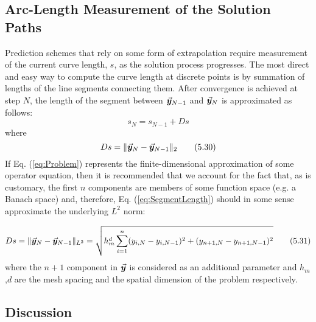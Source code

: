 \subsection{Arc-Length Measurement of the Solution Paths}
Prediction schemes that rely on some form of extrapolation require measurement 
of the current curve length, $s$, as the solution 
process progresses. The most direct and easy way
to compute the curve length at discrete points is by summation of lengths  
of the line segments connecting them. After convergence is achieved at step $N$,
the length of the segment between $\vec{\bm{y}}_{N-1}$ and $\vec{\bm{y}}_N$ is 
approximated as follows:
\begin{equation}
	s_N=s_{N-1}+Ds
	\tag{5.29}\label{eq:newS}
\end{equation}
where
\begin{equation}
	Ds = \Vert \vec{\bm{y}}_N-\vec{\bm{y}}_{N-1}\Vert_2
	\tag{5.30}\label{eq:SegmentLength}
\end{equation}
If Eq. (\ref{eq:Problem}) represents the finite-dimensional approximation of 
some operator
equation, then it is recommended\cite{Keller87} that we account for the fact
that, as is customary, the first $n$ components are members of some function
space (e.g. a Banach space) and, therefore, Eq. (\ref{eq:SegmentLength}) should 
in 
some sense approximate the underlying $L^2$ norm:

\begin{equation}
	Ds = \Vert 
	\vec{\bm{y}}_N-\vec{\bm{y}}_{N-1}\Vert_{L^2}=\sqrt{h_m^d\sum_{i=1}^n(y_{i,N}-y_{i,N-1})^2+(y_{n+1,N}-y_{n+1,N-1})^2}
	\tag{5.31}\label{eq:INCR}
\end{equation}
where the $n+1$ component in $\vec{\bm{y}}$ is considered as an additional 
parameter and
$h_m$,$d$ are the mesh spacing and the spatial dimension of the problem 
respectively.


\subsection{Discussion}\label{CH5-S3SS2}

